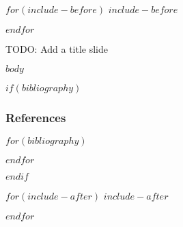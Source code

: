 \documentclass[aspectratio=169]{beamer}
\begin{document}
    $for(include-before)$
    $include-before$

    $endfor$

    \begin{frame}
        TODO: Add a title slide
    \end{frame}

    $body$

    $if(bibliography)$
    \begin{frame}[allowframebreaks]
        \frametitle{References}
        
        $for(bibliography)$
        
        $endfor$
    \end{frame}
    $endif$

    $for(include-after)$
    $include-after$

    $endfor$
\end{document}
